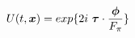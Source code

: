 \begin{equation}
U(t,\mbox{\boldmath$x$})= exp \{ 2i~\mbox{\boldmath$\tau$} \cdot \frac{\mbox{\boldmath$\phi$}}{F_\pi} \}
\end{equation}

